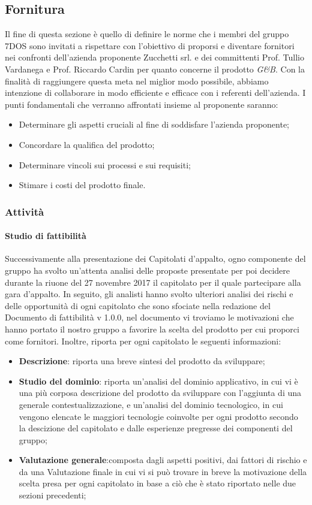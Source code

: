 \subsection{Fornitura}
Il fine di questa sezione è quello di definire le norme che i membri del gruppo 7DOS sono invitati a rispettare con l'obiettivo di proporsi e diventare fornitori nei confronti dell'azienda proponente Zucchetti srl. e dei committenti Prof. Tullio Vardanega e Prof. Riccardo Cardin per quanto concerne il prodotto \emph{G\&B}.
Con la finalità di raggiungere questa meta nel miglior modo possibile, abbiamo intenzione di collaborare in modo efficiente e efficace con i referenti dell'azienda. 
I punti fondamentali che verranno affrontati insieme al proponente saranno:
\begin{itemize}
\item Determinare gli aspetti cruciali al fine di soddisfare l'azienda proponente;
\item Concordare la qualifica del prodotto;
\item Determinare vincoli sui processi e sui requisiti;
\item Stimare i costi del prodotto finale.
\end{itemize}
\subsubsection{Attività}
\paragraph{Studio di fattibilità}\Spazio
Successivamente alla presentazione dei Capitolati d'appalto, ogno componente del gruppo ha svolto un'attenta analisi delle proposte presentate per poi decidere durante la riuone del 27 novembre 2017 il capitolato per il quale partecipare alla gara d'appalto. In seguito, gli analisti hanno svolto ulteriori analisi dei rischi e delle opportunità di ogni capitolato che sono sfociate nella redazione del Documento di fattibilità v 1.0.0, nel documento vi troviamo le motivazioni che hanno portato il nostro gruppo a favorire la scelta del prodotto per cui proporci come fornitori. Inoltre, riporta per ogni capitolato le seguenti informazioni:
\begin{itemize}
 	\item\textbf{{Descrizione}}: riporta una breve sintesi del prodotto da sviluppare;
 	\item\textbf{{Studio del dominio}}: riporta un'analisi del dominio applicativo, in cui vi è una più corposa descrizione del prodotto da sviluppare con l'aggiunta di una generale contestualizzazione, e un'analisi del dominio tecnologico, in cui vengono elencate le maggiori tecnologie coinvolte per ogni prodotto secondo la descizione del capitolato e dalle esperienze pregresse dei componenti del gruppo;
	\item\textbf{{Valutazione generale}}:composta dagli aspetti positivi, dai fattori di rischio e da una Valutazione finale in cui vi si può trovare in breve la motivazione della scelta presa per ogni capitolato in base a ciò che è stato riportato nelle due sezioni precedenti; 		
\end{itemize}

